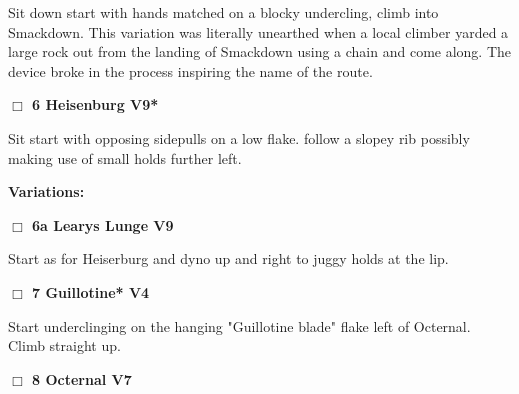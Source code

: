 \begin{multicols}{2}
\begin{adjustwidth}{0.5cm}{}
\begin{adjustwidth}{1.3em}{}
Sit down start with hands matched on a blocky undercling, climb into Smackdown. This variation was literally unearthed when a local climber yarded a large rock out from the landing of Smackdown using a chain and come along. The device broke in the process inspiring the name of the route.
\end{adjustwidth}



\end{adjustwidth}


\needspace{2em}
\label{rt:Heisenburg}
\colorbox{Goldenrod!20}{
\parbox{0.95\linewidth}{
\hspace{-1ex}\textbf{$\Box$
6 Heisenburg V9*  
}}}
\begin{adjustwidth}{1.3em}{}			

Sit start with opposing sidepulls on a low flake. follow a slopey rib possibly making use of small holds further left.
\end{adjustwidth}


\begin{adjustwidth}{0.5cm}{}				
\needspace{4em}
\textbf{Variations:} \newline

\needspace{2em}
\label{vr:Learys Lunge}
\colorbox{Goldenrod!20}{
\parbox{0.95\linewidth}{
\hspace{-1ex}\textbf{$\Box$
6a Learys Lunge V9  
}}}
\begin{adjustwidth}{1.3em}{}			

Start as for Heiserburg and dyno up and right to juggy holds at the lip.
\end{adjustwidth}



\end{adjustwidth}


\needspace{2em}
\label{rt:Guillotine}
\colorbox{RoyalBlue!20}{
\parbox{0.95\linewidth}{
\hspace{-1ex}\textbf{$\Box$
7 Guillotine* V4  
}}}
\begin{adjustwidth}{1.3em}{}			

Start underclinging on the hanging "Guillotine blade" flake left of Octernal. Climb straight up.
\end{adjustwidth}




\needspace{2em}
\label{rt:Octernal}
\colorbox{Goldenrod!20}{
\parbox{0.95\linewidth}{
\hspace{-1ex}\textbf{$\Box$
8 Octernal V7  
}}}
\begin{adjustwidth}{1.3em}{}			


\end{adjustwidth}
\end{multicols}
